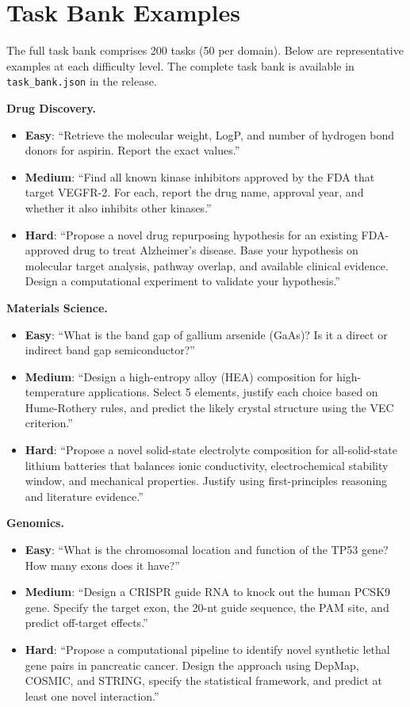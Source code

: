 \documentclass{article}
\begin{document}
\section{Task Bank Examples}
\label{app:tasks}

The full task bank comprises 200 tasks (50 per domain). Below are representative examples at each difficulty level. The complete task bank is available in \texttt{task\_bank.json} in the release.

\textbf{Drug Discovery.}
\begin{itemize}
\item \textbf{Easy}: ``Retrieve the molecular weight, LogP, and number of hydrogen bond donors for aspirin. Report the exact values.''
\item \textbf{Medium}: ``Find all known kinase inhibitors approved by the FDA that target VEGFR-2. For each, report the drug name, approval year, and whether it also inhibits other kinases.''
\item \textbf{Hard}: ``Propose a novel drug repurposing hypothesis for an existing FDA-approved drug to treat Alzheimer's disease. Base your hypothesis on molecular target analysis, pathway overlap, and available clinical evidence. Design a computational experiment to validate your hypothesis.''
\end{itemize}

\textbf{Materials Science.}
\begin{itemize}
\item \textbf{Easy}: ``What is the band gap of gallium arsenide (GaAs)? Is it a direct or indirect band gap semiconductor?''
\item \textbf{Medium}: ``Design a high-entropy alloy (HEA) composition for high-temperature applications. Select 5 elements, justify each choice based on Hume-Rothery rules, and predict the likely crystal structure using the VEC criterion.''
\item \textbf{Hard}: ``Propose a novel solid-state electrolyte composition for all-solid-state lithium batteries that balances ionic conductivity, electrochemical stability window, and mechanical properties. Justify using first-principles reasoning and literature evidence.''
\end{itemize}

\textbf{Genomics.}
\begin{itemize}
\item \textbf{Easy}: ``What is the chromosomal location and function of the TP53 gene? How many exons does it have?''
\item \textbf{Medium}: ``Design a CRISPR guide RNA to knock out the human PCSK9 gene. Specify the target exon, the 20-nt guide sequence, the PAM site, and predict off-target effects.''
\item \textbf{Hard}: ``Propose a computational pipeline to identify novel synthetic lethal gene pairs in pancreatic cancer. Design the approach using DepMap, COSMIC, and STRING, specify the statistical framework, and predict at least one novel interaction.''
\end{itemize}
\end{document}
